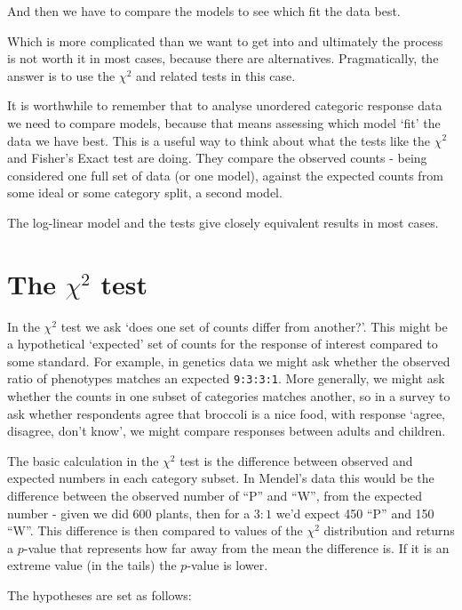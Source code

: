 \documentclass[
]{book}
\begin{document}
And then we have to compare the models to see which fit the data best.

Which is more complicated than we want to get into and ultimately the process is not worth it in most cases, because there are alternatives. Pragmatically, the answer is to use the \(\chi^2\) and related tests in this case.

It is worthwhile to remember that to analyse unordered categoric response data we need to compare models, because that means assessing which model `fit' the data we have best. This is a useful way to think about what the tests like the \(\chi^2\) and Fisher's Exact test are doing. They compare the observed counts - being considered one full set of data (or one model), against the expected counts from some ideal or some category split, a second model.

The log-linear model and the tests give closely equivalent results in most cases.

\hypertarget{the-chi2-test}{%
\section{\texorpdfstring{The \(\chi^2\) test}{The \textbackslash chi\^{}2 test}}\label{the-chi2-test}}

In the \(\chi^2\) test we ask `does one set of counts differ from another?'. This might be a hypothetical `expected' set of counts for the response of interest compared to some standard.
For example, in genetics data we might ask whether the observed ratio of phenotypes matches an expected \texttt{9:3:3:1}. More generally, we might ask whether the counts in one subset of categories matches another, so in a survey to ask whether respondents agree that broccoli is a nice food, with response `agree, disagree, don't know', we might compare responses between adults and children.

The basic calculation in the \(\chi^2\) test is the difference between observed and expected numbers in each category subset. In Mendel's data this would be the difference between the observed number of ``P'' and ``W'', from the expected number - given we did 600 plants, then for a \(3:1\) we'd expect 450 ``P'' and 150 ``W''. This difference is then compared to values of the \(\chi^2\) distribution and returns a \(p\)-value that represents how far away from the mean the difference is. If it is an extreme value (in the tails) the \(p\)-value is lower.

The hypotheses are set as follows:
\end{document}
